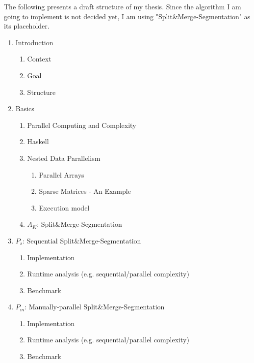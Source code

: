 \documentclass{article}
\newcommand{\seq}[0]{$P_{s}$}
\renewcommand{\mp}[0]{$P_{m}$}
\newcommand{\algo}[0]{Split\&Merge-Segmentation}
\begin{document}
\begin{itemize}
        The following presents a draft structure of my thesis.
        Since the algorithm I am going to implement is not decided yet, I am using "\algo" as its placeholder.

        \begin{enumerate}

        \item Introduction
            \begin{enumerate}
            \item Context
            \item Goal
            \item Structure
            \end{enumerate}

        \item Basics
            \begin{enumerate}
            \item Parallel Computing and Complexity
            \item Haskell
            \item Nested Data Parallelism
                \begin{enumerate}
                \item Parallel Arrays
                \item Sparse Matrices - An Example
                \item Execution model
                \end{enumerate}
            \item $A_{K}$: \algo
            \end{enumerate}

        \item \seq: Sequential \algo
            \begin{enumerate}
            \item Implementation
            \item Runtime analysis {\tiny (e.g. sequential/parallel complexity)}
            \item Benchmark
            \end{enumerate}

        \item \mp: Manually-parallel \algo
            \begin{enumerate}
            \item Implementation
            \item Runtime analysis {\tiny (e.g. sequential/parallel complexity)}
            \item Benchmark
            \end{enumerate}


\end{enumerate}
\end{itemize}
\end{document}
